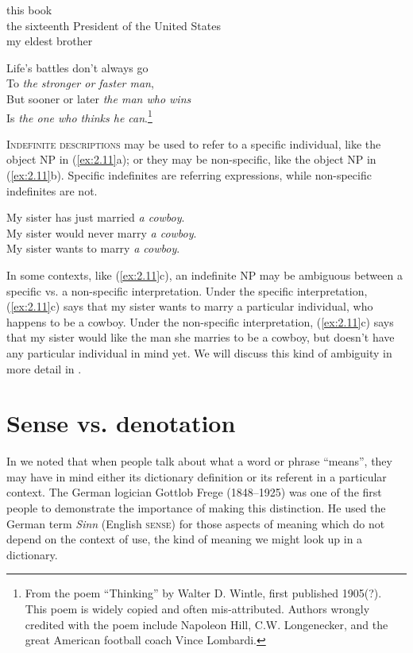 \ea \label{ex:2.9}
\ea this book\\
\ex the sixteenth President of the United States\\
\ex my eldest brother
                       \z
\z

\ea \label{ex:2.10}
Life’s battles don’t always go\\
\hspace{5mm}   To \textit{the stronger or faster man},\\
But sooner or later \textit{the man who wins}\\
\hspace{5mm}   Is \textit{the one who thinks he can}.\footnote{From the poem “Thinking” by Walter D. Wintle, first published 1905(?). This poem is widely copied and often mis-attributed. Authors wrongly credited with the poem include Napoleon Hill, C.W. Longenecker, and the great American football coach Vince Lombardi.}
\z


\textsc{Indefinite descriptions} may be used to refer to a specific individual, like the object NP in (\ref{ex:2.11}a); or they may be non-specific, like the object NP in (\ref{ex:2.11}b). Specific indefinites are referring expressions, while non-specific indefinites are not.


\ea \label{ex:2.11}
\ea My sister has just married \textit{a cowboy}.\\
\ex My sister would never marry \textit{a cowboy}.\\
\ex My sister wants to marry \textit{a cowboy}.
                       \z
\z


In some contexts, like (\ref{ex:2.11}c), an indefinite NP may be ambiguous between a specific vs. a non-specific interpretation. Under the specific interpretation, (\ref{ex:2.11}c) says that my sister wants to marry a particular individual, who happens to be a cowboy. Under the non-specific interpretation, (\ref{ex:2.11}c) says that my sister would like the man she marries to be a cowboy, but doesn’t have any particular individual in mind yet. We will discuss this kind of ambiguity in more detail in .


\section{Sense vs. denotation}\label{sec:2.4}
\largerpage
In  we noted that when people talk about what a word or phrase “means”, they may have in mind either its dictionary definition or its referent in a particular context. The German logician Gottlob Frege (1848–1925) was one of the first people to demonstrate the importance of making this distinction. He used the German term \textit{Sinn} (English \textsc{sense}) for those aspects of meaning which do not depend on the context of use, the kind of meaning we might look up in a dictionary.



